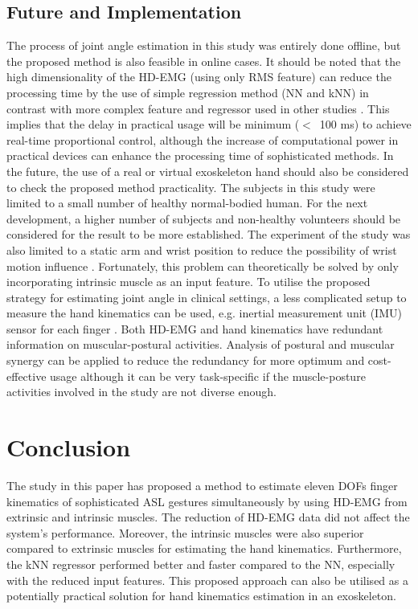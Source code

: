 \documentclass[conference]{IEEEtran}
\begin{document}
\subsection{Future and Implementation}
The process of joint angle estimation in this study was entirely done offline, but the proposed method 
is also feasible in online cases. It should be noted that the high dimensionality of the HD-EMG (using only 
RMS feature) can reduce the processing time by the use of simple regression method (NN and kNN) in 
contrast with more complex feature and regressor used in other studies \cite{b16}\cite{b19}. This implies that the delay 
in practical usage will be minimum ($<$~100 ms) to achieve real-time proportional control, although the 
increase of computational power in practical devices can enhance the processing time of sophisticated
methods. In the future, the use of a real or virtual exoskeleton hand should also be considered to check the 
proposed method practicality.
The subjects in this study were limited to a small number of healthy normal-bodied human. For the next 
development, a higher number of subjects and non-healthy volunteers should be considered for the result to 
be more established. The experiment of the study was also limited to a static arm and wrist position to reduce 
the possibility of wrist motion influence \cite{b39}. Fortunately, this problem can theoretically be solved by only 
incorporating intrinsic muscle as an input feature. To utilise the proposed strategy for estimating joint angle 
in clinical settings, a less complicated setup to measure the hand kinematics can be used, e.g. inertial 
measurement unit (IMU) sensor for each finger \cite{b40}.
Both HD-EMG and hand kinematics have redundant information on muscular-postural activities.
Analysis of postural and muscular synergy \cite{b36} can be applied to reduce the redundancy for more optimum 
and cost-effective usage although it can be very task-specific \cite{b41} if the muscle-posture activities involved 
in the study are not diverse enough.

\section{Conclusion}
The study in this paper has proposed a method to estimate eleven DOFs finger kinematics of 
sophisticated ASL gestures simultaneously by using HD-EMG from extrinsic and intrinsic muscles. The 
reduction of HD-EMG data did not affect the system's performance. Moreover, the intrinsic muscles were 
also superior compared to extrinsic muscles for estimating the hand kinematics. Furthermore, the kNN 
regressor performed better and faster compared to the NN, especially with the reduced input features. This 
proposed approach can also be utilised as a potentially practical solution for hand kinematics estimation in 
an exoskeleton.
\end{document}
